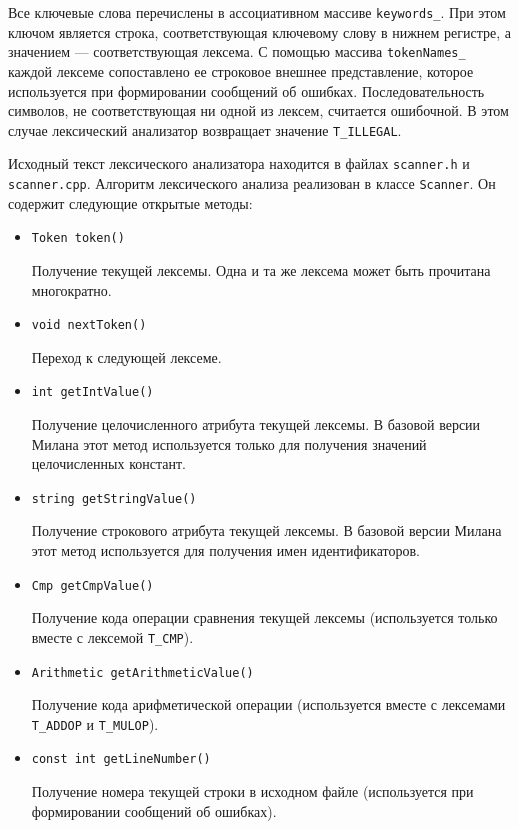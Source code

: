 \documentclass[a4paper,12pt]{article}
\begin{document}
Все ключевые слова перечислены в ассоциативном массиве \texttt{keywords\_}. При
этом ключом является строка, соответствующая ключевому слову в нижнем регистре,
а значением --- соответствующая лексема. С помощью массива \texttt{tokenNames\_}
каждой лексеме сопоставлено ее строковое внешнее представление, которое
используется при формировании сообщений об ошибках.  Последовательность
символов, не соответствующая ни одной из лексем, считается ошибочной. В этом
случае лексический анализатор возвращает значение \texttt{T\_ILLEGAL}.

Исходный текст лексического анализатора находится в файлах \texttt{scanner.h} и
\texttt{scanner.cpp}. Алгоритм лексического анализа реализован в классе
\texttt{Scanner}. Он содержит следующие открытые методы:

\begin{itemize}
\item \texttt{Token token()}

       Получение текущей лексемы. Одна и та же лексема может быть прочитана
       многократно.

\item \texttt{void nextToken()}

      Переход к следующей лексеме.

\item \texttt{int getIntValue()}

      Получение целочисленного атрибута текущей лексемы. В базовой версии Милана
      этот метод используется только для получения значений целочисленных
      констант.

\item \texttt{string getStringValue()}

      Получение	строкового атрибута текущей лексемы. В базовой версии Милана
      этот метод используется для получения имен идентификаторов.

\item \texttt{Cmp getCmpValue()}

      Получение кода операции сравнения текущей лексемы (используется только
      вместе с лексемой \texttt{T\_CMP}).

\item \texttt{Arithmetic getArithmeticValue()}

      Получение кода арифметической операции (используется вместе с лексемами
      \texttt{T\_ADDOP} и \texttt{T\_MULOP}).

\item \texttt{const int getLineNumber()}

       Получение номера текущей строки в исходном файле (используется при
       формировании сообщений об ошибках).
\end{itemize}
\end{document}
